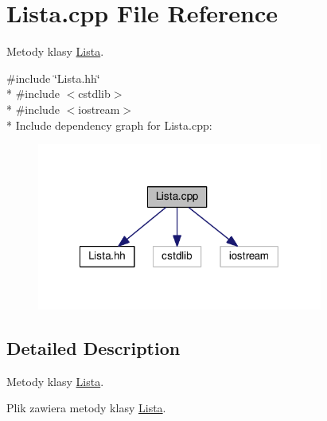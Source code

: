 \hypertarget{a00012}{}\section{Lista.\+cpp File Reference}
\label{a00012}


Metody klasy \hyperlink{a00004}{Lista}.  


{\ttfamily \#include \char`\"{}Lista.\+hh\char`\"{}}\\*
{\ttfamily \#include $<$cstdlib$>$}\\*
{\ttfamily \#include $<$iostream$>$}\\*
Include dependency graph for Lista.\+cpp\+:\nopagebreak
\begin{figure}[H]
\begin{center}
\leavevmode
\includegraphics[width=266pt]{a00026}
\end{center}
\end{figure}


\subsection{Detailed Description}
Metody klasy \hyperlink{a00004}{Lista}. 

Plik zawiera metody klasy \hyperlink{a00004}{Lista}. 